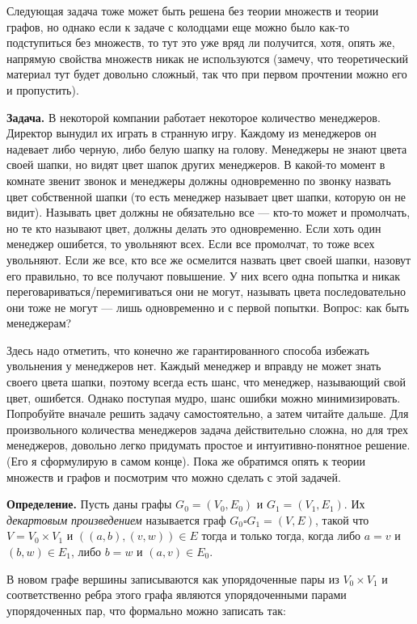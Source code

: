 Следующая задача тоже может быть решена без теории множеств и теории графов, но однако если к задаче с колодцами еще можно было как-то подступиться без множеств, то тут это уже вряд ли получится, хотя, опять же, напрямую свойства множеств никак не используются (замечу, что теоретический материал тут будет довольно сложный, так что при первом прочтении можно его и пропустить).

{\bfseries Задача.} В некоторой компании работает некоторое количество менеджеров. Директор вынудил их играть в странную игру. Каждому из менеджеров он надевает либо черную, либо белую шапку на голову. Менеджеры не знают цвета своей шапки, но видят цвет шапок других менеджеров. В какой-то момент в комнате звенит звонок и менеджеры должны одновременно по звонку назвать цвет собственной шапки (то есть менеджер называет цвет шапки, которую он не видит). Называть цвет должны не обязательно все — кто-то может и промолчать, но те кто называют цвет, должны делать это одновременно. Если хоть один менеджер ошибется, то увольняют всех.  Если все промолчат, то тоже всех увольняют. Если же все, кто все же осмелится назвать цвет своей шапки, назовут его правильно, то все получают повышение. У них всего одна попытка и никак переговариваться/перемигиваться они не могут, называть цвета последовательно они тоже не могут — лишь одновременно и с первой попытки. Вопрос: как быть менеджерам?

Здесь надо отметить, что конечно же гарантированного способа избежать увольнения у менеджеров нет. Каждый менеджер и вправду не может знать своего цвета шапки, поэтому всегда есть шанс, что менеджер, называющий свой цвет, ошибется. Однако поступая мудро, шанс ошибки можно минимизировать. Попробуйте вначале решить задачу самостоятельно, а затем читайте дальше. Для произвольного количества менеджеров задача действительно сложна, но для трех менеджеров, довольно легко придумать простое и интуитивно-понятное решение. (Его я сформулирую в самом конце). Пока же обратимся опять к теории множеств и графов и посмотрим что можно сделать с этой задачей.

{\bfseries Определение.} Пусть даны графы $G_0 = (V_0, E_0)$ и $G_1 = (V_1, E_1)$. Их {\slshape декартовым произведением} называется граф $G_0 \square G_1 = (V, E)$, такой что $V = V_0 \times V_1$ и $((a, b), (v, w)) \in E$ тогда и только тогда, когда либо $a=v$ и $(b, w) \in E_1$, либо $b=w$ и $(a, v) \in E_0$.

В новом графе вершины записываются как упорядоченные пары из $V_0 \times V_1$ и  соответственно ребра этого графа являются упорядоченными парами упорядоченных пар, что формально можно записать так:

